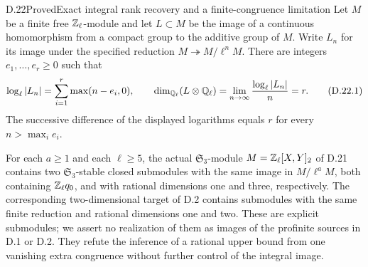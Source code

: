 \begin{statement}{D.22}{Proved}{Exact integral rank recovery and a finite-congruence limitation}
Let $M$ be a finite free $\mathbb Z_\ell$-module and let $L\subset M$
be the image of a continuous homomorphism from a compact group
to the additive group of $M$. Write $L_n$ for its image under
the specified reduction $M\twoheadrightarrow M/\ell^nM$.
There are integers $e_1,\ldots,e_r\geq0$ such that
\[
 \log_\ell|L_n|=\sum_{i=1}^r\max(n-e_i,0),\qquad
 \dim_{\mathbb Q_\ell}(L\otimes\mathbb Q_\ell)
       =\lim_{n\to\infty}\frac{\log_\ell|L_n|}{n}=r.
 \tag{D.22.1}
\]
The successive difference of the displayed logarithms equals
$r$ for every $n>\max_i e_i$.

For each $a\geq1$ and each $\ell\geq5$, the actual
$\mathfrak S_3$-module $M=\mathbb Z_\ell[X,Y]_2$ of D.21 contains
two $\mathfrak S_3$-stable closed submodules with the same
image in $M/\ell^aM$, both containing $\mathbb Z_\ell q_0$, and
with rational dimensions one and three, respectively.
The corresponding two-dimensional target of D.2 contains
submodules with the same finite reduction and rational
dimensions one and two. These are explicit submodules;
we assert no realization of them as images of the profinite
sources in D.1 or D.2. They refute the inference of a
rational upper bound from one vanishing extra congruence
without further control of the integral image.
\end{statement}
